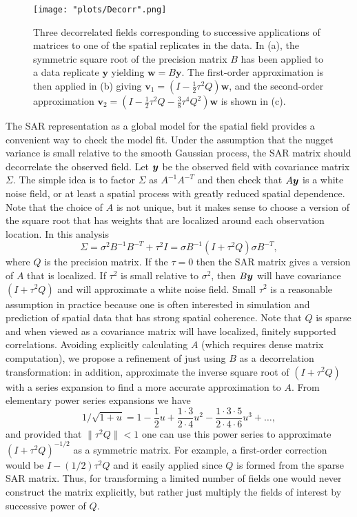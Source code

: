 \documentclass[review]{elsarticle}
\begin{document}
\begin{figure}
    \centering
    \texttt{[image: "plots/Decorr".png]} %
    \caption{Three decorrelated fields corresponding to successive applications of matrices to one of the spatial replicates in the data. In (a), the symmetric square root of the precision matrix $B$ has been applied to a data replicate $\mathbf y$ yielding $\mathbf w = B \mathbf y$. The first-order approximation is then applied in (b) giving $\mathbf v_1 =  (I - \frac{1}{2} \tau^2 Q)\mathbf w$, and the second-order approximation $\mathbf v_2 =  (I - \frac{1}{2} \tau^2 Q - \frac{3}{8} \tau^4 Q^2)\mathbf w$ is shown in (c).  }
    \label{f:6}
\end{figure}


The SAR representation as a global model for  the spatial field provides a convenient way to check the model fit.   Under the assumption that the nugget variance is small relative to the smooth Gaussian process, the SAR matrix should  decorrelate the observed field. 
Let $\mbox{\boldmath $y$}$ be the observed field with covariance matrix $\Sigma$. The simple idea is to factor $\Sigma$ as $A^{-1} A^{-T}$ and then  check that $A\mbox{\boldmath $y$}$ is a white noise field, or at least a spatial process with greatly reduced  spatial dependence. 
Note that the choice of $A$ is not unique, but it makes sense to choose a version of the square root that has weights that are localized around each observation location. In this analysis 
  \[ \Sigma=  \sigma^2 B^{-1} B^{-T} + \tau^2 I  = \sigma B^{-1}( I + \tau^2 Q ) \sigma B^{-T}, \]
where $Q$ is the precision matrix. If the $\tau= 0$ then the SAR matrix gives a version of $A$ that is localized. 
If $\tau^2$ is small relative to $\sigma^2$, then $B\mbox{\boldmath $y$}$ will have covariance  $(I +  \tau^2Q)$ and will approximate a white noise field. Small $\tau^2$ is a reasonable assumption in practice because one is often interested in simulation and prediction of spatial data that has strong spatial coherence. Note that $Q$ is sparse and when viewed as a covariance matrix will have localized, finitely supported correlations. Avoiding explicitly calculating $A$ (which requires dense matrix computation), we propose a refinement of just using $B$ as a decorrelation transformation: in addition, approximate the inverse square root of $( I + \tau^2 Q )$ with a series expansion to find a more accurate approximation to $A$. 
From elementary power series expansions we have 
\[ 1/\sqrt{ 1 + u} =  1  - \frac{1}{2}u + \frac{1\cdot 3}{2 \cdot 4} u^2 - \frac{1 \cdot 3 \cdot 5}{2 \cdot 4 \cdot 6} u^3 + \ldots, \]
and provided that  $\| \tau^2 Q \| < 1$  one can use this power series to approximate  $(I + \tau^2 Q)^{-1/2}$ as a symmetric matrix. For example, a first-order correction would be $I - (1/2) \tau^2 Q $ and it easily applied since $Q$ is formed from the sparse SAR matrix. Thus, for transforming a limited number of fields one would never construct the matrix explicitly, but rather just multiply the fields of interest by successive power of $Q$.
\end{document}
